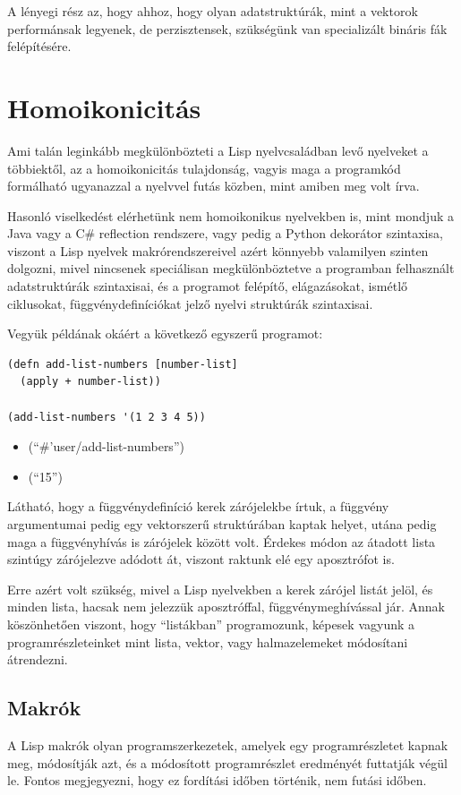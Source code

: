 \documentclass[final, 12pt] {ubb_dolgozat}{book}
\begin{document}
A lényegi rész az, hogy ahhoz, hogy olyan adatstruktúrák, mint a vektorok performánsak legyenek, de perzisztensek, szükségünk van
specializált bináris fák felépítésére.

\section{Homoikonicitás}
\label{sec:orgc57cbe3}
Ami talán leginkább megkülönbözteti a Lisp nyelvcsaládban levő nyelveket a többiektől, az a  homoikonicitás \citep{mcilroyMacroInstructionExtensions1960} tulajdonság, vagyis maga a programkód
formálható ugyanazzal a nyelvvel futás közben, mint amiben meg volt írva.

Hasonló viselkedést elérhetünk nem homoikonikus nyelvekben is, mint mondjuk a Java vagy a C\# reflection rendszere, vagy
pedig a Python dekorátor szintaxisa, viszont a Lisp nyelvek makrórendszereivel azért könnyebb valamilyen szinten dolgozni, mivel nincsenek speciálisan megkülönböztetve a programban
felhasznált adatstruktúrák szintaxisai, és a programot felépítő, elágazásokat, ismétlő ciklusokat, függvénydefiníciókat jelző nyelvi struktúrák szintaxisai.

Vegyük példának okáért a következő egyszerű programot:

\begin{verbatim}
(defn add-list-numbers [number-list]
  (apply + number-list))

(add-list-numbers '(1 2 3 4 5))
\end{verbatim}

\begin{itemize}
\item (``\#'user/add-list-numbers'')
\item (``15'')
\end{itemize}

Látható, hogy a függvénydefiníció kerek zárójelekbe írtuk, a függvény argumentumai pedig egy vektorszerű struktúrában kaptak helyet, utána pedig maga a függvényhívás is zárójelek között volt. Érdekes módon az átadott lista szintúgy zárójelezve adódott át, viszont raktunk elé egy aposztrófot is.

Erre azért volt szükség, mivel a Lisp nyelvekben a kerek zárójel listát jelöl, és minden lista, hacsak nem jelezzük aposztróffal, függvénymeghívással jár. Annak köszönhetően viszont, hogy ``listákban'' programozunk, képesek vagyunk a programrészleteinket mint lista, vektor, vagy halmazelemeket
módosítani átrendezni.

\subsection{Makrók}
\label{sec:org3fb8753}
A Lisp makrók olyan programszerkezetek, amelyek egy programrészletet kapnak meg, módosítják azt, és a módosított programrészlet eredményét futtatják végül le. Fontos megjegyezni, hogy ez fordítási időben történik, nem futási időben.
\end{document}
